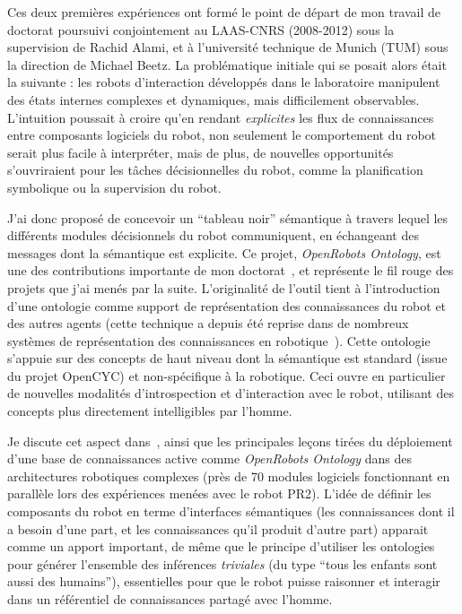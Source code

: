 \documentclass[a4paper]{article}
\begin{document}
Ces deux premières expériences ont formé le point de départ de mon travail de
doctorat poursuivi conjointement au LAAS-CNRS (2008-2012) sous la supervision de
Rachid Alami, et à l'université technique de Munich (TUM) sous la direction de
Michael Beetz. La problématique initiale qui se posait alors était la suivante :
les robots d'interaction développés dans le laboratoire manipulent des états
internes complexes et dynamiques, mais difficilement observables. L'intuition
poussait à croire qu'en rendant \emph{explicites} les flux de connaissances
entre composants logiciels du robot, non seulement le comportement du robot
serait plus facile à interpréter, mais de plus, de nouvelles opportunités
s'ouvriraient pour les tâches décisionnelles du robot, comme la planification
symbolique ou la supervision du robot.

J'ai donc proposé de concevoir un ``tableau noir'' sémantique à travers lequel
les différents modules décisionnels du robot communiquent, en échangeant des
messages dont la sémantique est explicite. Ce projet, \emph{OpenRobots
Ontology}, est une des contributions importante de mon
doctorat~\cite{lemaignan2010oro}, et représente le fil rouge des projets que j'ai
menés par la suite. L'originalité de l'outil tient à l'introduction d'une
ontologie comme support de représentation des connaissances du robot et des
autres agents (cette technique a depuis été reprise dans de nombreux systèmes de
représentation des connaissances en robotique~\cite{lemaignan2012symbolic}). Cette
ontologie s'appuie sur des concepts de haut niveau dont la sémantique est standard
(issue du projet {\sc OpenCYC}) et non-spécifique à la robotique. Ceci ouvre
en particulier de nouvelles modalités d'introspection et d'interaction avec le
robot, utilisant des concepts plus directement intelligibles par l'homme.

Je discute cet aspect dans~\cite{lemaignan2013explicit}, ainsi que les
principales leçons tirées du déploiement d'une base de connaissances active
comme \emph{OpenRobots Ontology} dans des architectures robotiques complexes
(près de 70 modules logiciels fonctionnant en parallèle lors des expériences
menées avec le robot PR2). L'idée de définir les composants du robot en terme
d'interfaces sémantiques (les connaissances dont il a besoin d'une part, et les
connaissances qu'il produit d'autre part) apparait comme un apport important, de
même que le principe d'utiliser les ontologies pour générer l'ensemble des
inférences \emph{triviales} (du type ``tous les enfants sont aussi des
humains''), essentielles pour que le robot puisse raisonner et interagir dans un
référentiel de connaissances partagé avec l'homme.
\end{document}
